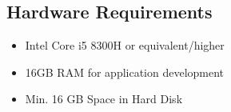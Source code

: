 \documentclass[openany,12pt]{report}
\begin{document}

	\subsection{Hardware Requirements}
	\begin{itemize}
		\item{Intel Core i5 8300H or equivalent/higher}
		\item{16GB RAM for application development}
		\item{Min. 16 GB Space in Hard Disk}
	\end{itemize}
	
\end{document}
